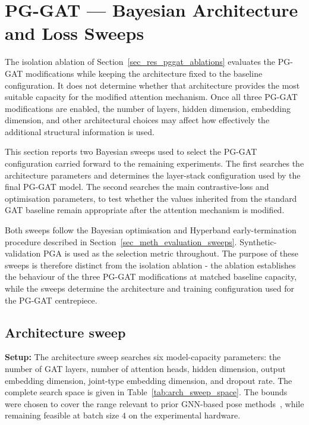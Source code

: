 \section{PG-GAT --- Bayesian Architecture and Loss Sweeps}
\label{sec_res_pggat_sweep}

The isolation ablation of Section~\ref{sec_res_pggat_ablations}
evaluates the PG-GAT modifications while keeping the architecture fixed
to the baseline configuration.
It does not determine whether that architecture provides the most
suitable capacity for the modified attention mechanism.
Once all three PG-GAT modifications are enabled,
the number of layers,
hidden dimension,
embedding dimension,
and other architectural choices may affect how effectively
the additional structural information is used.

This section reports two Bayesian sweeps used to select the PG-GAT
configuration carried forward to the remaining experiments.
The first searches the architecture parameters
and determines the layer-stack configuration used by the final PG-GAT model.
The second searches the main contrastive-loss and optimisation
parameters,
to test whether the values inherited from the standard GAT baseline
remain appropriate after the attention mechanism is modified.

Both sweeps follow the Bayesian optimisation and Hyperband
early-termination procedure described in
Section~\ref{sec_meth_evaluation_sweeps}.
Synthetic-validation PGA is used as the selection metric throughout.
The purpose of these sweeps is therefore distinct from the isolation
ablation -
the ablation establishes the behaviour of the three PG-GAT modifications
at matched baseline capacity,
while the sweeps determine the architecture and training configuration
used for the PG-GAT centrepiece.

\subsection{Architecture sweep}
\label{sec_res_pggat_arch_sweep}

\textbf{Setup:}
The architecture sweep searches six model-capacity parameters:
the number of GAT layers,
number of attention heads,
hidden dimension,
output embedding dimension,
joint-type embedding dimension,
and dropout rate.
The complete search space is given in Table~\ref{tab:arch_sweep_space}.
The bounds were chosen to cover the range relevant to prior GNN-based
pose methods~\cite{jin2020hgg, braso2021centergroup},
while remaining feasible at batch size $4$ on the experimental hardware.

